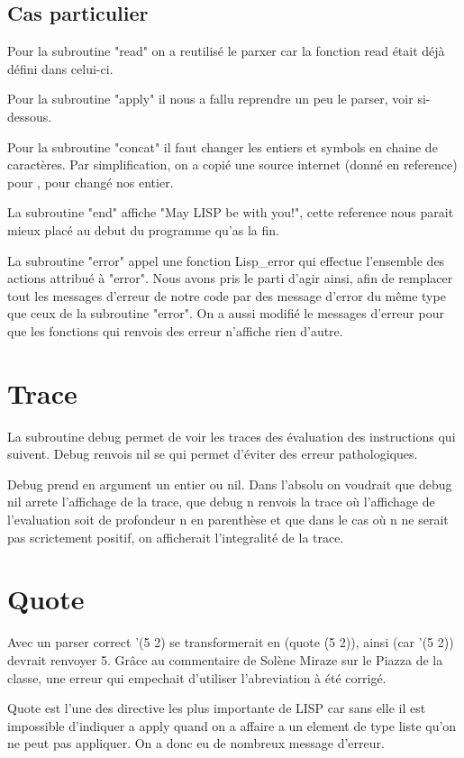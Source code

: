 \documentclass[a4paper]{article}
\begin{document}
\subsection{Cas particulier}
	Pour la subroutine "read" on a reutilisé le parxer car la fonction read était déjà défini dans celui-ci.
	
	Pour la subroutine "apply" il nous a fallu reprendre un peu le parser, voir si-dessous.

	Pour la subroutine "concat" il faut changer les entiers et symbols en chaine de caractères. Par simplification, on a copié une source internet (donné en reference) pour , pour changé nos entier.
	
	La subroutine "end" affiche "May LISP be with you!", cette reference nous parait mieux placé au debut du programme qu'as la fin.

	La subroutine "error" appel une fonction Lisp\_error qui effectue l'ensemble des actions attribué à "error". Nous avons pris le parti d'agir ainsi, afin de remplacer tout les messages d'erreur de notre code par des message d'error du même type que ceux de la subroutine "error". On a aussi modifié le messages d'erreur pour que les fonctions qui renvois des erreur n'affiche rien d'autre.

\section{Trace}
	La subroutine debug permet de voir les traces des évaluation des instructions qui suivent. Debug renvois nil se qui permet d'éviter des erreur pathologiques.
	
	Debug prend en argument un entier ou nil. Dans l'absolu on voudrait que debug nil arrete l'affichage de la trace, que debug n renvois la trace où l'affichage de l'evaluation soit de profondeur n en parenthèse et que dans le cas où n ne serait pas scrictement positif, on afficherait l'integralité de la trace.
	
\section{Quote}
	Avec un parser correct '(5 2) se transformerait en (quote (5 2)), ainsi (car '(5 2)) devrait renvoyer 5.	Grâce au commentaire de Solène Miraze sur le Piazza de la classe, une erreur qui empechait d'utiliser l'abreviation à été corrigé. 
	
	Quote est l'une des directive les plus importante de LISP car sans elle il est impossible d'indiquer a apply quand on a affaire a un element de type liste qu'on ne peut pas appliquer. On a donc eu de nombreux message d'erreur.
	
\end{document}

